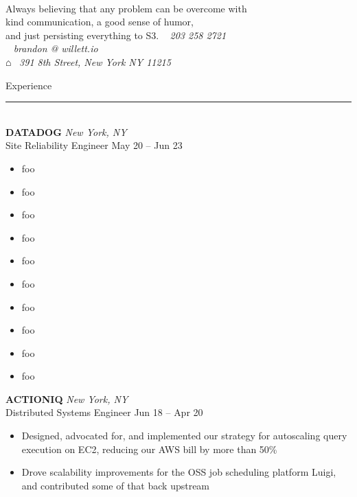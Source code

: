 \documentclass[letterpaper]{article}
\begin{document}
	\begin{bgbox}[height=\paperheight, colback=white, width=0.62\textwidth]\raggedright
		\vspace*{9pt}
		\begin{bgbox}[height=1.60in, colback=gray!15, width=\textwidth, top=0.05in]
			\\
			Always believing that any problem can be overcome with \\
			kind communication, a good sense of humor, \\
			and just persisting everything to S3. \hfill {\large\Telefon}~ \textit{203 258 2721} \\
			\null \hfill {\large\Letter}~ \textit{brandon @ willett.io } \\
			\null \hfill $\house$~ \textit{391 8th Street, New York NY 11215}
		\end{bgbox}\vspace*{25.5pt}
		{\Huge{Experience}}\\[-6pt]
		\noindent\rule{\textwidth}{1pt}\\[12pt]
		\textbf{DATADOG} \hfill \textit{New York, NY}\\
		Site Reliability Engineer \hfill May 20 -- Jun 23
		\begin{itemize} [noitemsep,topsep=4pt]
			\item foo
			\item foo
			\item foo
			\item foo
			\item foo
			\item foo
			\item foo
			\item foo
			\item foo
			\item foo
		\end{itemize}
		\vspace*{12pt}
		\textbf{ACTIONIQ} \hfill \textit{New York, NY}\\
		Distributed Systems Engineer \hfill Jun 18 -- Apr 20
		\begin{itemize} [noitemsep,topsep=4pt]
			\item Designed, advocated for, and implemented our strategy for autoscaling query execution on EC2, reducing our AWS bill by more than 50\%
			\item Drove scalability improvements for the OSS job scheduling platform Luigi, and contributed some of that back upstream

\end{itemize}
\end{bgbox}
\end{document}
